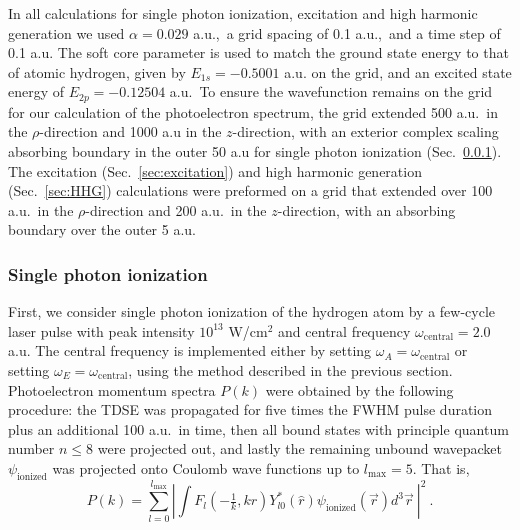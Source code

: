 In all calculations for single photon ionization, excitation and high harmonic generation we used $\alpha=0.029$ a.u.,\ a grid spacing of 0.1 a.u.,\ and a time step of 0.1 a.u. The soft core parameter is used to match the ground state energy to that of atomic hydrogen, given by $E_{1s} = -0.5001$ a.u. on the grid, and an excited state energy of $E_{2p} = -0.12504$ a.u.\  To ensure the wavefunction remains on the grid for our calculation of the photoelectron spectrum, the grid extended 500 a.u.\  in the $\rho$-direction and 1000 a.u in the $z$-direction, with an exterior complex scaling absorbing boundary in the outer 50 a.u for single photon ionization
(Sec.~\ref{sec:single_photon}). The excitation (Sec.~\ref{sec:excitation}) and high harmonic generation (Sec.~\ref{sec:HHG}) calculations were preformed on a grid that extended over 100 a.u.\  in the $\rho$-direction and 200 a.u.\ in the $z$-direction, with an absorbing boundary over the outer 5 a.u.

\subsubsection{Single photon ionization}
\label{sec:single_photon}

First, we consider single photon ionization of the hydrogen atom by a few-cycle laser pulse with peak intensity $10^{13}$ W/cm$^2$ and central frequency $\omega_{\text{central}} = 2.0$ a.u. The central frequency is implemented either by setting $\omega_A=\omega_{\text{central}}$ or setting $\omega_E=\omega_{\text{central}}$, using the method described in the previous section. Photoelectron momentum spectra $P(k)$ were obtained by the following procedure: the TDSE was propagated for five times the FWHM pulse duration plus an additional 100 a.u.\  in time, then all bound states with principle quantum number $n\le 8$ were projected out, and lastly the remaining unbound wavepacket $\psi_{\text{ionized}}$ was projected onto Coulomb wave functions up to $l_{\text{max}}=5$. That is,
%
\begin{equation}
P(k) = \sum_{l=0}^{l_{\text{max}}} \left|\int F_{l}(-\tfrac{1}{k}, kr)Y^*_{l0}(\hat{r})\psi_{\text{ionized}}(\vec{r})d^{3}\vec{r}~\right|^2 ~.
\end{equation}



